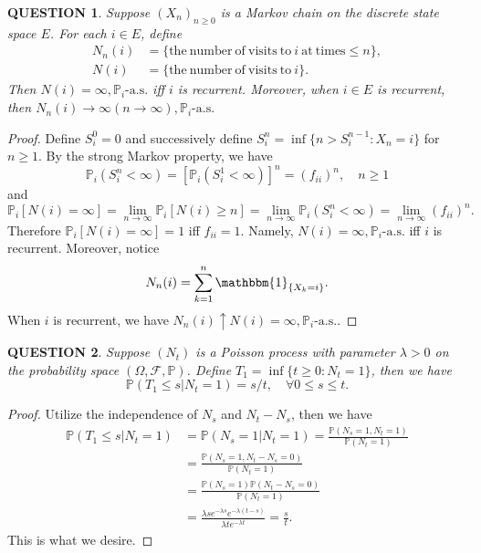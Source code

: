 \documentclass[12pt]{article}
\renewcommand{\(}{\left(}%
\renewcommand{\)}{\right)}%
\renewcommand{\[}{\left[}%
\renewcommand{\]}{\right]}%
\renewcommand{\ae}{\mathrm{a.s.}}
\newcommand{\p}{\mathbb{P}}
\newcommand{\f}{\mathscr{F}}
\newtheorem{question}{QUESTION}[section]}
\newtheorem{proof}{Proof.}}
\begin{document}
  \begin{question}
   Suppose $(X_n)_{n\geq 0}$ is a Markov chain on the discrete state space $E$. For each $i\in E$, define
   \begin{equation*}
    \begin{split}
     N_n(i)&=\{\mathrm{the\ number\ of \ visits\ to\  }i \mathrm{\ at\ times}\leq n \},\\
     N(i)&=\{\mathrm{the\ number\ of \ visits\ to\  }i \}.
    \end{split}
   \end{equation*}
    Then $N(i)=\infty, \p_i\text{-}\ae$ iff $i$ is recurrent. Moreover, when $i\in E$ is recurrent, then $N_n(i)\to \infty(n\to\infty),\p_i\text{-}\ae$
  \end{question}
  \begin{proof}
    Define $S_i^0=0$ and successively define $S_i^{n}=\inf\{n>S_{i}^{n-1}:X_n=i\}$ for $n\geq 1$. By the {\sffamily strong Markov property}, we have
    \begin{equation*}
     \p_i(S_i^n<\infty)=[\p_i(S_i^1<\infty)]^n=(f_{ii})^{n},\quad n\geq 1
    \end{equation*}
    and
   \begin{equation*}
    \p_i[N(i)=\infty]=\lim_{n \to\infty}\p_i[N(i)\geq n ]=\lim_{n \to\infty} \p_i(S_i^n <\infty )=\lim_{n \to\infty} (f_{ii})^{n}.
   \end{equation*}
   Therefore $\p_i[N(i)=\infty]=1$ iff $f_{ii}=1$. Namely, $N(i)=\infty, \p_i\text{-}\ae$ iff $i$ is recurrent. Moreover, notice
   \begin{equation*}
    N_n(i)=\sum_{k=1}^n\mathbbm{1}_{\{X_k=i\}}.
   \end{equation*}
   When $i$ is recurrent, we have $N_n(i)\uparrow N(i)=\infty,\p_i\text{-}\ae$.
  \end{proof}

  \begin{question}
   Suppose $(N_t)$ is a Poisson process with parameter $\lambda>0$ on the probability space $(\Omega,\f,\p )$. Define $T_1=\inf\{t\geq 0:N_t=1 \}$, then we have
   \begin{equation*}
    \p(T_1\leq s|N_t=1)=s/t,\quad \forall 0\leq s\leq t.
   \end{equation*}
  \end{question}
  \begin{proof}
   Utilize the independence of $N_s$ and $N_t-N_s$, then we have
   \begin{equation*}
    \begin{split}
     \p(T_1\leq s|N_t=1)&=\p(N_s=1|N_t=1 )=\frac{\p(N_s=1,N_t=1 )}{\p(N_t=1)}\\
     &=\frac{\p(N_s=1,N_t-N_s=0 )}{\p(N_t=1)}\\
     &=\frac{\p(N_s=1)\p(N_t-N_s=0 )}{\p(N_t=1)}\\
     &=\frac{\lambda se^{-\lambda s} e^{-\lambda(t-s)}}{\lambda te^{-\lambda t}}=\frac{s}{t}.
    \end{split}
   \end{equation*}
   This is what we desire.
  \end{proof}
\end{document}
